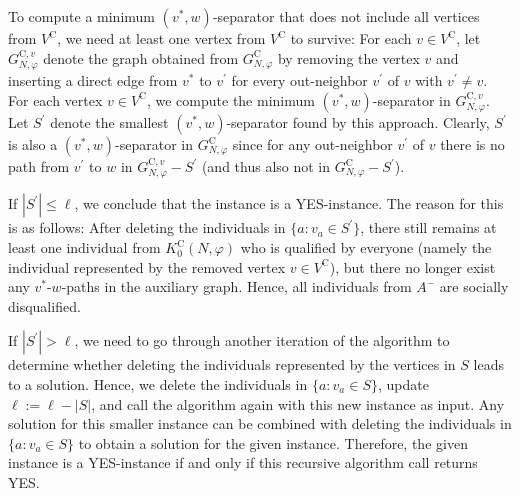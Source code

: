 \documentclass[
    12pt,               %
    a4paper,            %
    bibtotoc,           %
    pointlessnumbers,   %
    ngerman,            %
    titlepage,          %
    leqno,              %
    ]{scrarticle}       %
\begin{document}
\begin{Proof}
To compute a minimum $(v^\ast, w)$-separator that does not include all vertices from $V^{\text{C}}$, we need at least one vertex from $V^{\text{C}}$ to survive: For each $v \in V^{\text{C}}$, let $G_{N, \varphi}^{\text{C}, v}$ denote the graph obtained from $G_{N, \varphi}^{\text{C}}$ by removing the vertex $v$ and inserting a direct edge from $v^\ast$ to $v^\prime$ for every out-neighbor $v^\prime$ of $v$ with $v^\prime \neq v$. For each vertex $v \in V^{\text{C}}$, we compute the minimum $(v^\ast, w)$-separator in $G_{N, \varphi}^{\text{C}, v}$. Let $S^\prime$ denote the smallest $(v^\ast, w)$-separator found by this approach. Clearly, $S^\prime$ is also a $(v^\ast, w)$-separator in $G_{N, \varphi}^{\text{C}}$ since for any out-neighbor $v^\prime$ of $v$ there is no path from $v^\prime$ to $w$ in $G_{N, \varphi}^{\text{C}, v} - S^\prime$ (and thus also not in $G_{N, \varphi}^{\text{C}} - S^\prime$).

If $|S^\prime| \leq \ell$, we conclude that the instance is a YES-instance. The reason for this is as follows: After deleting the individuals in $\{ a : v_a \in S^\prime \}$, there still remains at least one individual from $K^{\text{C}}_0(N, \varphi)$ who is qualified by everyone (namely the individual represented by the removed vertex $v \in V^{\text{C}}$), but there no longer exist any $v^\ast$-$w$-paths in the auxiliary graph. Hence, all individuals from $A^-$ are socially disqualified.

If $|S^\prime| > \ell$, we need to go through another iteration of the algorithm to determine whether deleting the individuals represented by the vertices in $S$ leads to a solution. Hence, we delete the individuals in $\{ a : v_a \in S \}$, update $\ell := \ell - |S|$, and call the algorithm again with this new instance as input. Any solution for this smaller instance can be combined with deleting the individuals in $\{ a : v_a \in S \}$ to obtain a solution for the given instance. Therefore, the given instance is a YES-instance if and only if this recursive algorithm call returns YES.


\end{Proof}
\end{document}
